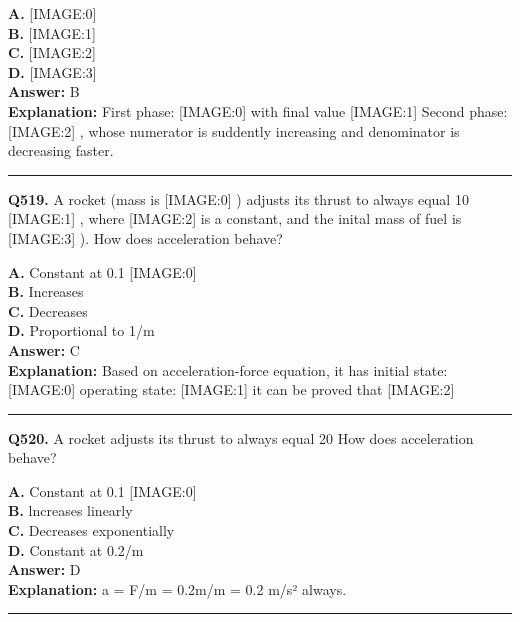 \documentclass[12pt]{article}
\begin{document}
\textbf{A.} [IMAGE:0] \\
\textbf{B.} [IMAGE:1] \\
\textbf{C.} [IMAGE:2] \\
\textbf{D.} [IMAGE:3] \\

\textbf{Answer:} B \\
\textbf{Explanation:} First phase:
[IMAGE:0]
with final value
[IMAGE:1]
Second phase:
[IMAGE:2]
, whose numerator is suddently increasing and denominator is decreasing faster.

\hrule
\vspace{1em}


\noindent
\textbf{Q519.} A rocket (mass is
[IMAGE:0]
) adjusts its thrust to always equal 10%
[IMAGE:1]
, where
[IMAGE:2]
is a constant, and the inital mass of fuel is
[IMAGE:3]
).
How does acceleration behave?



\textbf{A.} Constant at 0.1
[IMAGE:0] \\
\textbf{B.} Increases \\
\textbf{C.} Decreases \\
\textbf{D.} Proportional to 1/m \\

\textbf{Answer:} C \\
\textbf{Explanation:} Based on acceleration-force equation, it has
initial state:
[IMAGE:0]
operating state:
[IMAGE:1]
it can be proved that
[IMAGE:2]

\hrule
\vspace{1em}


\noindent
\textbf{Q520.} A rocket adjusts its thrust to always equal 20%
How does acceleration behave?



\textbf{A.} Constant at 0.1
[IMAGE:0] \\
\textbf{B.} lncreases linearly \\
\textbf{C.} Decreases exponentially \\
\textbf{D.} Constant at 0.2/m \\

\textbf{Answer:} D \\
\textbf{Explanation:} a = F/m = 0.2m/m = 0.2 m/s² always.

\hrule
\vspace{1em}
\end{document}
